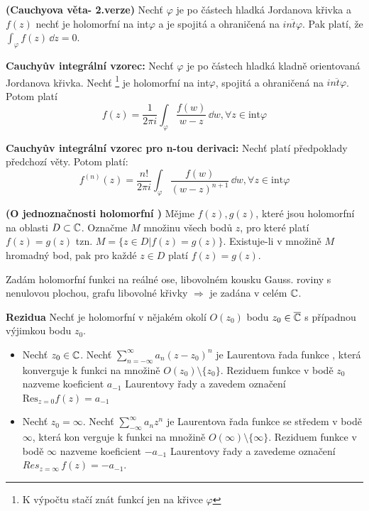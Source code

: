 \begin{theorem}
\textbf{(Cauchyova věta- 2.verze)} Nechť $\varphi$ je po částech hladká Jordanova křivka a \fce $f(z)$ nechť je holomorfní na int$\varphi$ a je spojitá a ohraničená na $\overline{int\varphi}$. Pak platí, že $\int_{\varphi} f(z)\, \dd z=0.$  
\end{theorem}




\textbf{Cauchyův integrální vzorec:}
Nechť $\varphi$ je po částech hladká kladně orientovaná Jordanova křivka. Nechť \fce\footnote{K výpočtu stačí znát funkcí jen na křivce $\varphi$} \fz je holomorfní na int$\varphi$, spojitá a ohraničená na $\overline{int\varphi}$. Potom platí $$f(z)=\frac{1}{2\pi 
i }\int_{\varphi}\frac{f(w)}{w-z}\, \dd w, \forall z \in \text{int}\varphi$$


\textbf{Cauchyův integrální vzorec pro n-tou derivaci:}
Nechť platí předpoklady předchozí věty. Potom platí:
$$f^{(n)}(z)=\frac{n!}{2\pi i}\int_{\varphi}\frac{f(w)}{(w-z)^{n+1}}\, \dd w, \forall z \in \text{int}\varphi$$

\begin{theorem}
	\textbf{(O jednoznačnosti holomorfní \fce)}
	Mějme \fce $f(z),g(z)$, které jsou holomorfní na oblasti $D \subset \mathbb{C}$. Označme $M$ množinu všech bodů $z$, pro které platí $f(z)=g(z)$ tzn. $M=\{ z \in D | f(z)=g(z)\}$. Existuje-li v množině $M$ hromadný bod, pak pro každé $z\in D$ platí $f(z)=g(z)$.
	
\begin{dusledek}
	Zadám holomorfní funkci na reálné ose, libovolném kousku Gauss. roviny s nenulovou plochou, grafu libovolné křivky $\Rightarrow$ \fce je zadána v celém $\mathbb{C}$.
\end{dusledek}
\end{theorem}

\begin{definition}
	\textbf{Rezidua}
	Nechť \fce \fz je holomorfní v nějakém okolí $O(z_0)$ bodu $z_0 \in \overline{\mathbb{C}}$  s případnou výjimkou bodu $z_0$.
    \begin{itemize}
    \item Nechť $z_0 \in \mathbb{C}$. Nechť   $\sum_{n=-\infty}^{\infty}a_n(z-z_0)^n$ je Laurentova řada funkce \fz, která konverguje k funkci \fz na množině $O(z_0)\setminus \{z_0\}$. Reziduem funkce \fz v bodě $z_0$ nazveme koeficient $a_{-1}$ Laurentovy řady a zavedem označení $\mathrm{Res}_{z=0} f(z)=a_{-1}$  
\item  Nechť $z_0=\infty$. Nechť  $\sum_{-\infty}^{\infty} a_nz^n$ je Laurentova řada funkce \fz se středem v bodě $\infty $, která kon verguje k funkci \fz na množině $O(\infty)\setminus \{\infty\}$. Reziduem funkce \fz v bodě $\infty $ nazveme koeficient $-a_{-1}$ Laurentovy řady a zavedeme označení $Res_{z=\infty} \, f(z)=-a_{-1}$.
    \end{itemize}
\end{definition}

